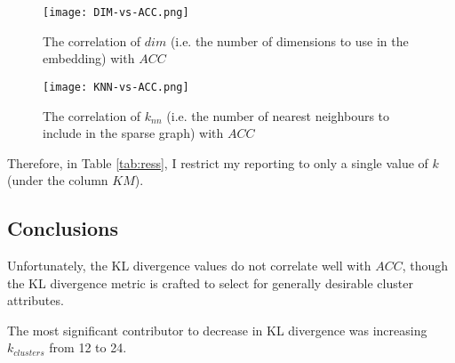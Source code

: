 \documentclass{article}
\begin{document}
\begin{figure}
    \centering
    \texttt{[image: DIM-vs-ACC.png]}
    \caption{The correlation of $dim$ (i.e. the number of dimensions to use in the embedding) with $ACC$}
    \label{fig:acc_v_dim}
\end{figure}
\begin{figure}
    \centering
    \texttt{[image: KNN-vs-ACC.png]}
    \caption{The correlation of $k_{nn}$ (i.e. the number of nearest neighbours to include in the sparse graph) with $ACC$}
    \label{fig:acc_v_knn}
\end{figure}


Therefore, in Table \ref{tab:ress}, I restrict my reporting to only a single value of $k$ (under the column $KM$).


\subsection{Conclusions}

Unfortunately, the KL divergence values do not correlate well with $ACC$, though the KL divergence metric is crafted to select for generally desirable cluster attributes.

The most significant contributor to decrease in KL divergence was increasing $k_{clusters}$ from 12 to 24.






\end{document}

